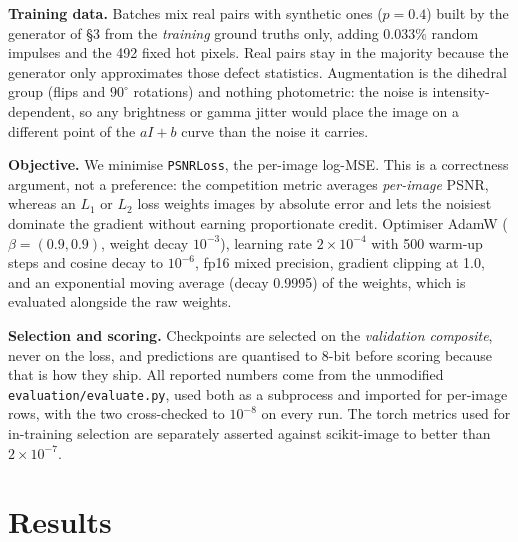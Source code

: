 \textbf{Training data.} Batches mix real pairs with synthetic ones ($p=0.4$) built by the
generator of \S3 from the \emph{training} ground truths only, adding $0.033\%$ random
impulses and the 492 fixed hot pixels. Real pairs stay in the majority because the
generator only approximates those defect statistics. Augmentation is the dihedral group
(flips and $90^\circ$ rotations) and nothing photometric: the noise is
intensity-dependent, so any brightness or gamma jitter would place the image on a
different point of the $aI+b$ curve than the noise it carries.

\textbf{Objective.} We minimise \texttt{PSNRLoss}, the per-image log-MSE. This is a
correctness argument, not a preference: the competition metric averages \emph{per-image}
PSNR, whereas an $L_1$ or $L_2$ loss weights images by absolute error and lets the
noisiest dominate the gradient without earning proportionate credit. Optimiser AdamW
($\beta=(0.9,0.9)$, weight decay $10^{-3}$), learning rate $2\times10^{-4}$ with 500
warm-up steps and cosine decay to $10^{-6}$, fp16 mixed precision, gradient clipping at
1.0, and an exponential moving average (decay 0.9995) of the weights, which is evaluated
alongside the raw weights.

\textbf{Selection and scoring.} Checkpoints are selected on the \emph{validation
composite}, never on the loss, and predictions are quantised to 8-bit before scoring
because that is how they ship. All reported numbers come from the unmodified
\texttt{evaluation/evaluate.py}, used both as a subprocess and imported for per-image
rows, with the two cross-checked to $10^{-8}$ on every run. The torch metrics used for
in-training selection are separately asserted against scikit-image to better than
$2\times10^{-7}$.

\section{Results}

